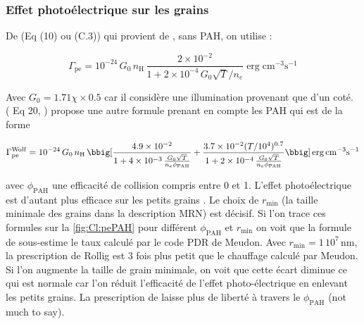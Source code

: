 \subsubsection{Effet photoélectrique sur les grains}

De \cite{Rollig2005} (Eq (10) ou (C.3)) qui provient de \cite{BakesTielens1994}, sans PAH, on utilise : 

\begin{equation}
    \Gamma_{\mathrm{pe}} = 10^{-24}\,G_0\,n_\mathrm{H}\, \frac{2\times 10^{-2}}{1 + 2\times 10^{-4}\,G_0 \sqrt{T}/n_e} \operatorname{erg} \mathrm{cm}^{-3} \mathrm{s}^{-1}
\end{equation}

Avec $G_0 = 1.71\chi \times 0.5$ car il considère une illumination provenant que d'un coté. (\cite{Wolfire_2003} Eq 20, \cite{BakesTielens1994}) propose une autre formule prenant en compte les PAH qui est de la forme 

\begin{equation}
    \Gamma_{\mathrm{pe}}^{\mathrm{Wolf}} = 10^{-24}\,G_0\,n_\mathrm{H}\, \bbig[ \frac{4.9\times 10^{-2}}{1 + 4\times 10^{-3}\, \frac{G_0 \sqrt{T}}{n_e \phi_\mathrm{PAH}}} + \frac{3.7\times 10^{-2} (T/10^4)^{0.7}}{1 + 2\times 10^{-4}\, \frac{G_0 \sqrt{T}}{n_e \phi_\mathrm{PAH}}} \bbig] \operatorname{erg} \mathrm{cm}^{-3} \mathrm{s}^{-1}
\end{equation}

avec $\phi_\mathrm{PAH}$ une efficacité de collision compris entre 0 et 1. L'effet photoélectrique est d'autant plus efficace sur les petits grains \cite{DraineBook}. Le choix de $r_\mathrm{min}$ (la taille minimale des grains dans la description MRN) est décisif. Si l'on trace ces formules sur la \autoref{fig:Cl:pePAH} pour différent $\phi_\mathrm{PAH}$ et $r_\mathrm{min}$ on voit que la formule de \cite{Rollig2005} sous-estime le taux calculé par le code PDR de Meudon. Avec $r_\mathrm{min} = 1\,10^7\,\mathrm{nm}$, la prescription de Rollig est 3 fois plus petit que le chauffage calculé par Meudon. Si l'on augmente la taille de grain minimale, on voit que cette écart diminue ce qui est normale car l'on réduit l'efficacité de l'effet photo-électrique en enlevant les petits grains. La prescription de \cite{Wolfire_2003} laisse plus de liberté à travers le $\phi_\mathrm{PAH}$ (not much to say).

